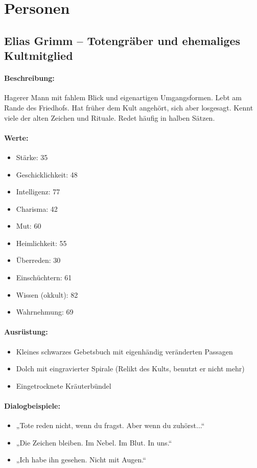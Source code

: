 \section{Personen}
\subsection{Elias Grimm – Totengräber und ehemaliges Kultmitglied}
\paragraph{Beschreibung:}
Hagerer Mann mit fahlem Blick und eigenartigen Umgangsformen. Lebt am Rande des Friedhofs. Hat früher dem Kult angehört, sich aber losgesagt. Kennt viele der alten Zeichen und Rituale. Redet häufig in halben Sätzen.
\paragraph{Werte:}
\begin{itemize}
\item Stärke: 35
\item Geschicklichkeit: 48
\item Intelligenz: 77
\item Charisma: 42
\item Mut: 60
\item Heimlichkeit: 55
\item Überreden: 30
\item Einschüchtern: 61
\item Wissen (okkult): 82
\item Wahrnehmung: 69
\end{itemize}
\paragraph{Ausrüstung:}
\begin{itemize}
\item Kleines schwarzes Gebetsbuch mit eigenhändig veränderten Passagen
\item Dolch mit eingravierter Spirale (Relikt des Kults, benutzt er nicht mehr)
\item Eingetrocknete Kräuterbündel
\end{itemize}
\paragraph{Dialogbeispiele:}
\begin{itemize}
\item „Tote reden nicht, wenn du fragst. Aber wenn du zuhörst...“
\item „Die Zeichen bleiben. Im Nebel. Im Blut. In uns.“
\item „Ich habe ihn gesehen. Nicht mit Augen.“
\end{itemize}
